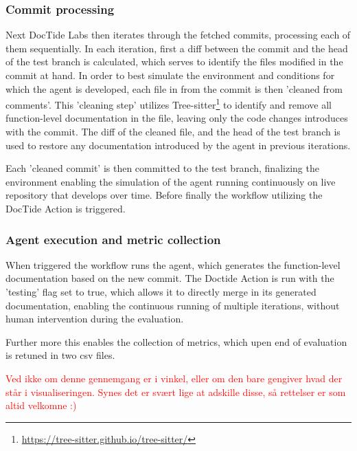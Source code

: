 \subsubsection{Commit processing}
Next DocTide Labs then iterates through the fetched commits, processing each of them sequentially. In each iteration, first a diff between the commit and the head of the test branch is calculated, which serves to identify the files modified in the commit at hand. In order to best simulate the environment and conditions for which the agent is developed, each file in from the commit is then 'cleaned from comments'. This 'cleaning step' utilizes Tree-sitter\footnote{\url{https://tree-sitter.github.io/tree-sitter/}} to identify and remove all function-level documentation in the file, leaving only the code changes introduces with the commit. The diff of the cleaned file, and the head of the test branch is used to restore any documentation introduced by the agent in previous iterations.

Each 'cleaned commit' is then committed to the test branch, finalizing the environment enabling the simulation of the agent running continuously on live repository that develops over time. Before finally the workflow utilizing the DocTide Action is triggered.

\subsubsection{Agent execution and metric collection}
When triggered the workflow runs the agent, which generates the function-level documentation based on the new commit. The Doctide Action is run with the 'testing' flag set to true, which allows it to directly merge in its generated documentation, enabling the continuous running of multiple iterations, without human intervention during the evaluation. 

Further more this enables the collection of metrics, which upen end of evaluation is retuned in two csv files.

\textcolor{red}{Ved ikke om denne gennemgang er i vinkel, eller om den bare gengiver hvad der står i visualiseringen. Synes det er svært lige at adskille disse, så rettelser er som altid velkomne :) }

